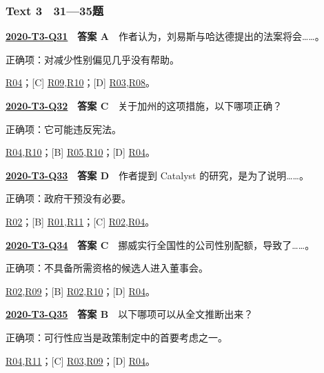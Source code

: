 \documentclass[11pt,a4paper]{article}
\begin{document}
\subsubsection{Text 3　31—35题}
\label{idx-2020-T3-Q31}
\noindent\textbf{\href{https://zj139.github.io/math-notes/english/4998b7c1fb5c1b5a77934651/\#q31}{2020-T3-Q31}　答案 A}　作者认为，刘易斯与哈达德提出的法案将会……。\par\nopagebreak
\noindent 正确项：对减少性别偏见几乎没有帮助。\par\nopagebreak
\noindent [B] \hyperref[cat-R04]{R04}；[C] \hyperref[cat-R09]{R09},\hyperref[cat-R10]{R10}；[D] \hyperref[cat-R03]{R03},\hyperref[cat-R08]{R08}。
\par\smallskip
{}\label{idx-2020-T3-Q32}
\noindent\textbf{\href{https://zj139.github.io/math-notes/english/4998b7c1fb5c1b5a77934651/\#q32}{2020-T3-Q32}　答案 C}　关于加州的这项措施，以下哪项正确？\par\nopagebreak
\noindent 正确项：它可能违反宪法。\par\nopagebreak
\noindent [A] \hyperref[cat-R04]{R04},\hyperref[cat-R10]{R10}；[B] \hyperref[cat-R05]{R05},\hyperref[cat-R10]{R10}；[D] \hyperref[cat-R04]{R04}。
\par\smallskip
{}\label{idx-2020-T3-Q33}
\noindent\textbf{\href{https://zj139.github.io/math-notes/english/4998b7c1fb5c1b5a77934651/\#q33}{2020-T3-Q33}　答案 D}　作者提到 Catalyst 的研究，是为了说明……。\par\nopagebreak
\noindent 正确项：政府干预没有必要。\par\nopagebreak
\noindent [A] \hyperref[cat-R02]{R02}；[B] \hyperref[cat-R01]{R01},\hyperref[cat-R11]{R11}；[C] \hyperref[cat-R02]{R02},\hyperref[cat-R04]{R04}。
\par\smallskip
{}\label{idx-2020-T3-Q34}
\noindent\textbf{\href{https://zj139.github.io/math-notes/english/4998b7c1fb5c1b5a77934651/\#q34}{2020-T3-Q34}　答案 C}　挪威实行全国性的公司性别配额，导致了……。\par\nopagebreak
\noindent 正确项：不具备所需资格的候选人进入董事会。\par\nopagebreak
\noindent [A] \hyperref[cat-R02]{R02},\hyperref[cat-R09]{R09}；[B] \hyperref[cat-R02]{R02},\hyperref[cat-R10]{R10}；[D] \hyperref[cat-R04]{R04}。
\par\smallskip
{}\label{idx-2020-T3-Q35}
\noindent\textbf{\href{https://zj139.github.io/math-notes/english/4998b7c1fb5c1b5a77934651/\#q35}{2020-T3-Q35}　答案 B}　以下哪项可以从全文推断出来？\par\nopagebreak
\noindent 正确项：可行性应当是政策制定中的首要考虑之一。\par\nopagebreak
\noindent [A] \hyperref[cat-R04]{R04},\hyperref[cat-R11]{R11}；[C] \hyperref[cat-R03]{R03},\hyperref[cat-R09]{R09}；[D] \hyperref[cat-R04]{R04}。
\par\smallskip
\end{document}

